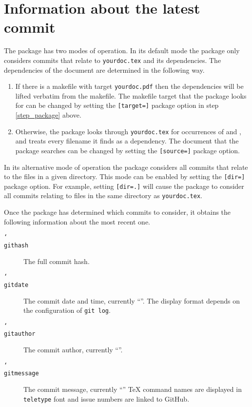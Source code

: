\documentclass[12pt,a4paper]{article}
\begin{document}
	\section*{Information about the latest commit}
	The package has two modes of operation.
	In its default mode the package only considers commits that relate to
	\verb+yourdoc.tex+ and its dependencies.
	The dependencies of the document are determined in the following way.
	\begin{enumerate}
		\item
		If there is a makefile with target \verb+yourdoc.pdf+ then the dependencies
		will be lifted verbatim from the makefile. The makefile target that the
		package looks for can be changed by setting the \verb+[target=]+ package
		option in step \ref{step_package} above.
		\item
		Otherwise, the package looks through \verb+yourdoc.tex+ for occurrences
		of \verb++ and \verb++, and treats every
		filename it finds as a dependency.
		The document that the package searches can be changed by setting the
		\verb+[source=]+ package option.
	\end{enumerate}

	In its alternative mode of operation the package considers all commits that
	relate to the files in a given directory. This mode can be enabled by setting
	the \verb+[dir=]+ package option. For example, setting \verb+[dir=.]+ will
	cause the package to consider all commits relating to files in the same
	directory as \verb+yourdoc.tex+.

	Once the package has determined which commits to consider, it obtains the
	following information about the most recent one.
	\begin{description}
		\item[\texttt{\char`\\githash}]
		The full commit hash.
		\item[\texttt{\char`\\gitdate}]
		The commit date and time, currently ``\gitdate''. The display format depends
		on the configuration of \verb+git log+.
		\item[\texttt{\char`\\gitauthor}]
		The commit author, currently ``\gitauthor''.
		\item[\texttt{\char`\\gitmessage}]
		The commit message, currently ``\gitmessage'' \TeX{} command names are
		displayed in \texttt{teletype} font and issue numbers are linked to
		GitHub.
	\end{description}
\end{document}
